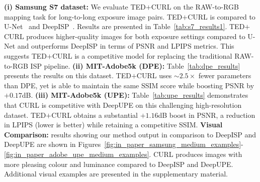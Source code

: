 \documentclass[a4paper,conference]{IEEEtran}
\begin{document}
\begin{table}[t] 
\centering
\small
\caption{\small\textbf{Medium-to-medium} exposure RAW to RGB mapping results on the held-out test images of the \textbf{Samsung S7 dataset}~\cite{schwartz19}.} 
\label{tab:s7_results1}
\end{table}

{}\quad \textbf{(i) Samsung S7 dataset:} We evaluate TED$+$CURL on the RAW-to-RGB mapping task for long-to-long exposure image pairs. TED$+$CURL is compared to U-Net~\cite{Ronneberger15} and DeepISP~\cite{schwartz19}. Results are presented in Table~\ref{tab:s7_results1}. TED$+$CURL produces higher-quality images for both exposure settings compared to U-Net and outperforms DeepISP in terms of PSNR and LPIPS metrics. This suggests TED$+$CURL is a competitive model for replacing the traditional RAW-to-RGB ISP pipeline. \textbf{(ii) MIT-Adobe5k (DPE):} Table~\ref{tab:dpe_results} presents the results on this dataset. TED$+$CURL uses ${\sim}2.5{\times}$ fewer parameters than DPE, yet is able to maintain the same SSIM score while boosting PSNR by $+0.17$dB. \textbf{(iii) MIT-Adobe5k (UPE):}  Table~\ref{tab:upe_results} demonstrates that CURL is competitive with DeepUPE on this challenging high-resolution dataset. TED$+$CURL obtains a substantial $+1.16$dB boost in PSNR, a reduction in LPIPS (lower is better) while retaining a competitive SSIM. \textbf{Visual Comparison:} results showing our method output in comparison to DeepISP and DeepUPE are shown in Figures~\ref{fig:in_paper_samsung_medium_examples}-\ref{fig:in_paper_adobe_upe_medium_examples}. CURL produces images with more pleasing colour and luminance compared to DeepISP and DeepUPE. Additional visual examples are presented in the supplementary material.
\end{document}
